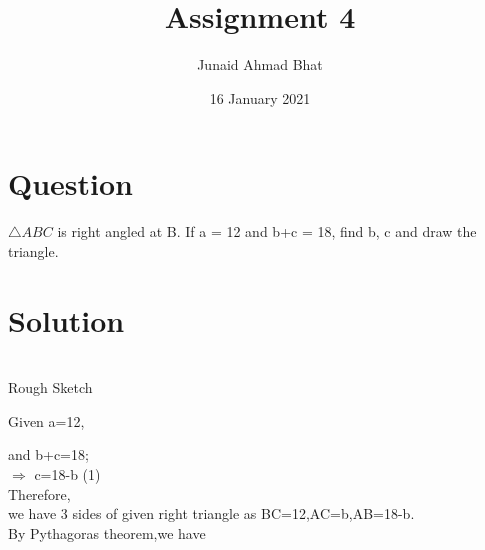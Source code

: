 \documentclass[a4paper,12pt]{article}
\begin{document}
\title{Assignment 4}
\author{Junaid Ahmad Bhat}
\date{16 January 2021}
\maketitle
\section*{\small Question}

$\triangle  ABC$ is right angled at B. If a = 12 and b+c =
18, find b, c and draw the triangle.

\section*{\small Solution}
\\
\hspace*{4cm} Rough Sketch

\vspace*{0.3cm}

Given \hspace*{3.8cm} a=12,\\

\vspace*{1mm}

and  \hspace*{3cm}  b+c=18;\\

$\Rightarrow$  \hspace*{3.5cm} c=18-b    \hspace*{1.5cm}(1)\\

Therefore,\\
\hspace*{0.5cm} we have 3 sides of given right triangle as BC=12,AC=b,AB=18-b.\\

\pagebreak
By Pythagoras theorem,we have\\
\end{document}
